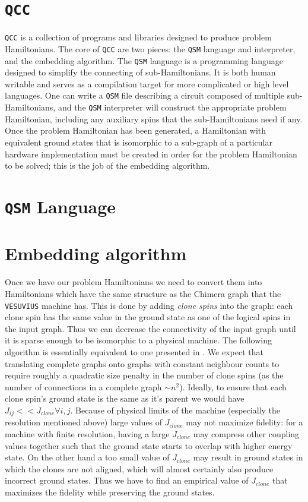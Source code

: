 \section{\texttt{QCC}}
\texttt{QCC} is a collection of programs and libraries designed to produce problem Hamiltonians.  The core of \texttt{QCC} are two pieces: the \texttt{QSM} language and interpreter, and the embedding algorithm.  The \texttt{QSM} language is a programming language designed to simplify the connecting of sub-Hamiltonians.  It is both human writable and serves as a compilation target for more complicated or high level languages.  One can write a \texttt{QSM} file describing a circuit composed of multiple sub-Hamiltonians, and the \texttt{QSM} interpreter will construct the appropriate problem Hamiltonian, including any auxiliary spins that the sub-Hamiltonians need if any.  Once the problem Hamiltonian has been generated, a Hamiltonian with equivalent ground states that is isomorphic to a sub-graph of a particular hardware implementation must be created in order for the problem Hamiltonian to be solved; this is the job of the embedding algorithm.

\section{\texttt{QSM} Language}

\section{Embedding algorithm}
Once we have our problem Hamiltonians we need to convert them into Hamiltonians which have the same structure as the Chimera graph that the \texttt{VESUVIUS} machine has.  This is done by adding \emph{clone spins} into the graph: each clone spin has the same value in the ground state as one of the logical spins in the input graph.  
Thus we can decrease the connectivity of the input graph until it is sparse enough to be isomorphic to a physical machine.  The following algorithm is essentially equivalent to one presented in \cite{choi1}.
We expect that translating complete graphs onto graphs with constant neighbour counts to require roughly a quadratic size penalty in the number of clone spins (as the number of connections in a complete graph $\sim n^2$).
Ideally, to ensure that each clone spin's ground state is the same as it's parent we would have $J_{ij} << J_{clone} \forall i,j$.  Because of physical limits of the machine (especially the resolution mentioned above) large values of $J_{clone}$ may not maximize fidelity: for a machine with finite resolution, having a large $J_{clone}$ may compress other coupling values together such that the ground state starts to overlap with higher energy state.  On the other hand a too small value of $J_{clone}$ may result in ground states in which the clones are not aligned, which will almost certainly also produce incorrect ground states. Thus we have to find an empirical value of $J_{clone}$ that maximizes the fidelity while preserving the ground states.

